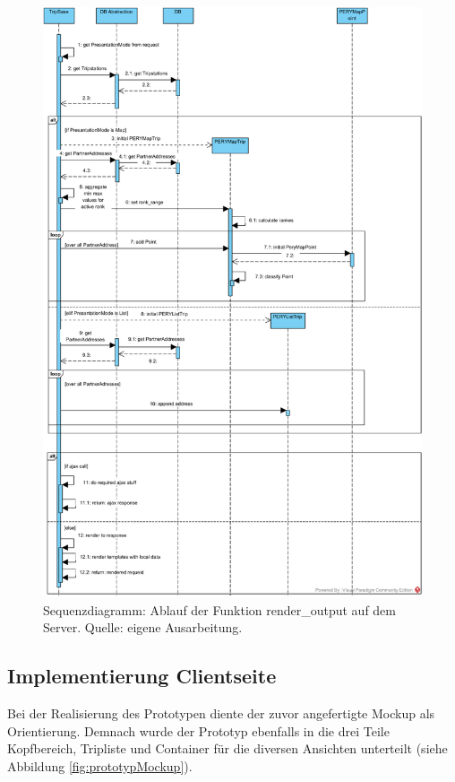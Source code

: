 \documentclass[Bachelorarbeit.tex]{subfiles}
\begin{document}
\begin{figure}[h]
\centering
\includegraphics[width=1\linewidth]{img/Implementierung/renderOutput}
\caption[k]{Sequenzdiagramm: Ablauf der Funktion render\_output auf dem Server. Quelle: eigene Ausarbeitung.}
\label{fig:renderOutput}
\end{figure}

\subsection{Implementierung Clientseite}
Bei der Realisierung des Prototypen diente der zuvor angefertigte Mockup als Orientierung. 
Demnach wurde der Prototyp ebenfalls in die drei Teile Kopfbereich, Tripliste und Container für die diversen Ansichten unterteilt (siehe Abbildung \ref{fig:prototypMockup}).
\end{document}

